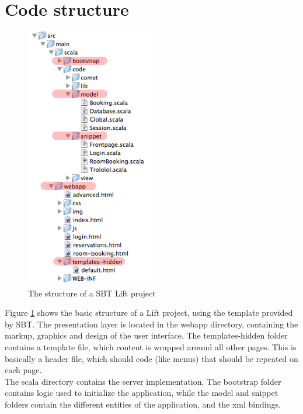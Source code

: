 \section{Code structure}
\label{app:lift_structure}
\begin{figure}[htb]
\begin{center}
\leavevmode
\includegraphics[width=0.5\textwidth]{images/code_structure}
\end{center}
\caption{The structure of a SBT Lift project}
\label{fig:code_structure}
\end{figure}

Figure \ref{fig:code_structure} shows the basic structure of a Lift project, using the template provided by SBT. The presentation layer is located in the webapp directory, containing the markup, graphics and design of the user interface. The templates-hidden folder contains a template file, which content is wrapped around all other pages. This is basically a header file, which should code (like menus) that should be repeated on each page.\\

The scala directory contains the server implementation. The bootstrap folder contains logic used to initialize the application, while the model and snippet folders contain the different entities of the application, and the xml bindings.